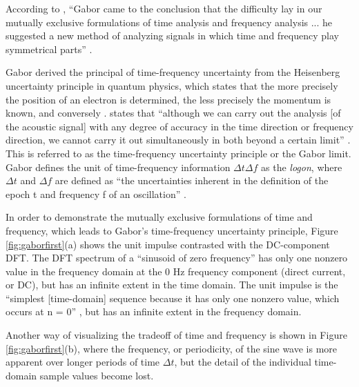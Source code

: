 \documentclass[report.tex]{subfiles}
\begin{document}
According to \citeauthor{korpel}, ``Gabor came to the conclusion that the difficulty lay in our mutually exclusive formulations of time analysis and frequency analysis ... he suggested a new method of analyzing signals in which time and frequency play symmetrical parts'' \parencite[3624]{korpel}.

Gabor derived the principal of time-frequency uncertainty from the Heisenberg uncertainty principle in quantum physics, which states that the more precisely the position of an electron is determined, the less precisely the momentum is known, and conversely . \citeauthor{gabor1946} states that ``although we can carry out the analysis [of the acoustic signal] with any degree of accuracy in the time direction or frequency direction, we cannot carry it out simultaneously in both beyond a certain limit'' \parencite[432]{gabor1946}. This is referred to as the time-frequency uncertainty principle or the Gabor limit. Gabor defines the unit of time-frequency information $\Delta t \Delta f$ as the \textit{logon}, where $\Delta t$ and $\Delta f$ are defined as ``the uncertainties inherent in the definition of the epoch t and frequency f of an oscillation'' \parencite[432]{gabor1946}.

In order to demonstrate the mutually exclusive formulations of time and frequency, which leads to Gabor's time-frequency uncertainty principle, Figure \ref{fig:gaborfirst}(a) shows the unit impulse contrasted with the DC-component DFT. The DFT spectrum of a ``sinusoid of zero frequency'' \parencite[13]{dspfirst} has only one nonzero value in the frequency domain at the 0 Hz frequency component (direct current, or DC), but has an infinite extent in the time domain. The unit impulse is the ``simplest [time-domain] sequence because it has only one nonzero value, which occurs at n = 0'' \parencite[107]{dspfirst}, but has an infinite extent in the frequency domain.

Another way of visualizing the tradeoff of time and frequency is shown in Figure \ref{fig:gaborfirst}(b), where the frequency, or periodicity, of the sine wave is more apparent over longer periods of time $\Delta t$, but the detail of the individual time-domain sample values become lost.
\end{document}
